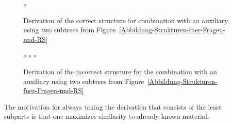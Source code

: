 \begin{figure}[htb]
\hfill
{}
\hfill
$\circ$
\hfill
\hspace{5mm}
\hfill\mbox{}
\caption{\label{Abbildung-Kombination-fuer-grammatischen-Satz}Derivation of the correct structure for combination with an auxiliary using two subtrees from
Figure~\ref{Abbildung-Strukturen-fuer-Fragen-und-RS}}
\end{figure}%
%
%
%
%
\begin{figure}[htb]
\hfill
{}
\hfill
$\circ$
\hfill
{}
\hfill
$\circ$
\hfill
{}
\hfill
$\circ$
\hfill
{}
\hfill\mbox{}
\caption{\label{Abbildung-Kombination-fuer-ungrammatischen-Satz}Derivation of the incorrect structure
for the combination with an auxiliary using two subtrees from Figure~\ref{Abbildung-Strukturen-fuer-Fragen-und-RS}}
\end{figure}%

The motivation for always taking the derivation that consists of the least subparts is that one maximizes similarity to already known material.

